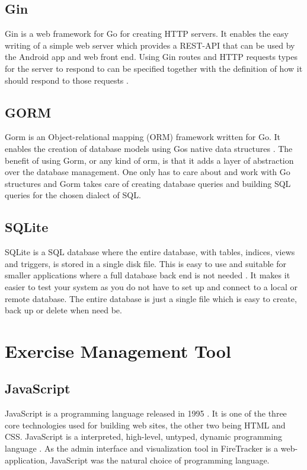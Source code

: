 \documentclass[../Main/thesis.tex]{subfiles}
\begin{document}
\subsection{Gin}
Gin is a web framework for Go for creating HTTP servers.
It enables the easy writing of a simple web server which provides a REST-API that can be used by the Android app and web front end. 
Using Gin routes and HTTP requests types for the server to respond to can be specified together with the definition of how it should respond to those requests \citep{Martinez-Almeida2017}.

\subsection{GORM}
Gorm is an Object-relational mapping (ORM) framework written for Go.
It enables the creation of database models using Gos native data structures \citep{JInzhuZhang2018}.
The benefit of using Gorm, or any kind of orm, is that it adds a layer of abstraction over the database management.
One only has to care about and work with Go structures and Gorm takes care of creating database queries and building SQL queries for the chosen dialect of SQL.

\subsection{SQLite}
SQLite is a SQL database where the entire database, with tables, indices, views and triggers, is stored in a single disk file.
This is easy to use and suitable for smaller applications where a full database back end is not needed \citep{Hipp2015}.
It makes it easier to test your system as you do not have to set up and connect to a local or remote database.
The entire database is just a single file which is easy to create, back up or delete when need be.

\section{Exercise Management Tool}
\subsection{JavaScript}
JavaScript is a programming language released in 1995 \citep{Netscape1995}.
It is one of the three core technologies used for building web sites, the other two being HTML and CSS.
JavaScript is a interpreted, high-level, untyped, dynamic programming language \citep{Flanagan2011}.
As the admin interface and visualization tool in FireTracker is a web-application, JavaScript was the natural choice of programming language.
\end{document}
